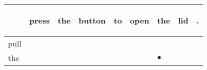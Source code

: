 \documentclass[landscape]{article}
\newcommand{\ssp}{\hspace{2pt}}
\newcommand{\mex}{\cellcolor{g}$\bullet$}
\begin{document}
\noindent\begin{tabular}{|l|p{10pt}|p{10pt}|p{10pt}|p{10pt}|p{10pt}|p{10pt}|p{10pt}|p{10pt}|}
\hline
&\begin{sideways}\cellcolor{ref0}press\hspace{12pt}\end{sideways}&\begin{sideways}\cellcolor{ref1}the\hspace{12pt}\end{sideways}&\begin{sideways}\cellcolor{ref2}button\hspace{12pt}\end{sideways}&\begin{sideways}\cellcolor{ref3}to\hspace{12pt}\end{sideways}&\begin{sideways}\cellcolor{ref4}open\hspace{12pt}\end{sideways}&\begin{sideways}\cellcolor{ref5}the\hspace{12pt}\end{sideways}&\begin{sideways}\cellcolor{ref6}lid\hspace{12pt}\end{sideways}&\begin{sideways}\cellcolor{ref7}.\hspace{12pt}\end{sideways}\\
\hline
\ssp pull \ssp&\hspace{2pt}&\hspace{2pt}&\hspace{2pt}&\hspace{2pt}&\hspace{2pt}&\hspace{2pt}&\hspace{2pt}&\hspace{2pt}\\
\hline
\ssp \cellcolor{ref5}the \ssp&\hspace{2pt}&\hspace{2pt}&\hspace{2pt}&\hspace{2pt}&\hspace{2pt}&\hspace{2pt}\mex&\hspace{2pt}&\hspace{2pt}\\

\end{tabular}
\end{document}
